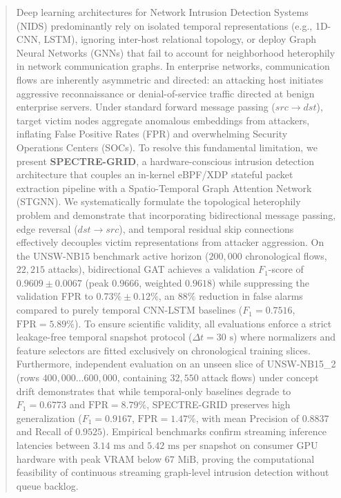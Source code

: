 \documentclass[conference]{IEEEtran}
\begin{document}
\begin{abstract}
Deep learning architectures for Network Intrusion Detection Systems (NIDS) predominantly rely on isolated temporal representations (e.g., 1D-CNN, LSTM), ignoring inter-host relational topology, or deploy Graph Neural Networks (GNNs) that fail to account for neighborhood heterophily in network communication graphs. In enterprise networks, communication flows are inherently asymmetric and directed: an attacking host initiates aggressive reconnaissance or denial-of-service traffic directed at benign enterprise servers. Under standard forward message passing ($src \to dst$), target victim nodes aggregate anomalous embeddings from attackers, inflating False Positive Rates (FPR) and overwhelming Security Operations Centers (SOCs). To resolve this fundamental limitation, we present \textbf{SPECTRE-GRID}, a hardware-conscious intrusion detection architecture that couples an in-kernel eBPF/XDP stateful packet extraction pipeline with a Spatio-Temporal Graph Attention Network (STGNN). We systematically formulate the topological heterophily problem and demonstrate that incorporating bidirectional message passing, edge reversal ($dst \to src$), and temporal residual skip connections effectively decouples victim representations from attacker aggression. On the UNSW-NB15 benchmark active horizon ($200{,}000$ chronological flows, $22{,}215$ attacks), bidirectional GAT achieves a validation $F_1$-score of $0.9609 \pm 0.0067$ (peak $0.9666$, weighted $0.9618$) while suppressing the validation FPR to $0.73\% \pm 0.12\%$, an $88\%$ reduction in false alarms compared to purely temporal CNN-LSTM baselines ($F_1 = 0.7516$, $\text{FPR} = 5.89\%$). To ensure scientific validity, all evaluations enforce a strict leakage-free temporal snapshot protocol ($\Delta t = 30\text{ s}$) where normalizers and feature selectors are fitted exclusively on chronological training slices. Furthermore, independent evaluation on an unseen slice of UNSW-NB15\_2 (rows $400{,}000 \dots 600{,}000$, containing $32{,}550$ attack flows) under concept drift demonstrates that while temporal-only baselines degrade to $F_1 = 0.6773$ and $\text{FPR} = 8.79\%$, SPECTRE-GRID preserves high generalization ($F_1 = 0.9167$, $\text{FPR} = 1.47\%$, with mean Precision of $0.8837$ and Recall of $0.9525$). Empirical benchmarks confirm streaming inference latencies between $3.14\text{ ms}$ and $5.42\text{ ms}$ per snapshot on consumer GPU hardware with peak VRAM below $67\text{ MiB}$, proving the computational feasibility of continuous streaming graph-level intrusion detection without queue backlog.
\end{abstract}
\end{document}
